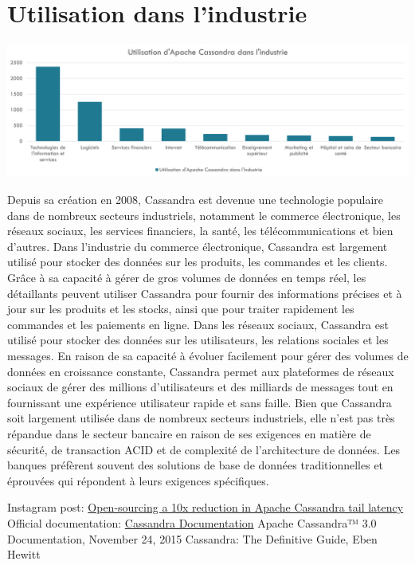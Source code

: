 \documentclass[12pt, letterpaper]{report}
\begin{document}
\section{Utilisation dans l'industrie}
\begin{center}
	\includegraphics[width=\textwidth]{utilisation}
\end{center}
Depuis sa création en 2008, Cassandra est devenue une technologie populaire dans de nombreux secteurs industriels, notamment le commerce électronique, les réseaux sociaux, les services financiers, la santé, les télécommunications et bien d'autres.
\newline
Dans l'industrie du commerce électronique, Cassandra est largement utilisé pour stocker des données sur les produits, les commandes et les clients. Grâce à sa capacité à gérer de gros volumes de données en temps réel, les détaillants peuvent utiliser Cassandra pour fournir des informations précises et à jour sur les produits et les stocks, ainsi que pour traiter rapidement les commandes et les paiements en ligne.
\newline
Dans les réseaux sociaux, Cassandra est utilisé pour stocker des données sur les utilisateurs, les relations sociales et les messages. En raison de sa capacité à évoluer facilement pour gérer des volumes de données en croissance constante, Cassandra permet aux plateformes de réseaux sociaux de gérer des millions d'utilisateurs et des milliards de messages tout en fournissant une expérience utilisateur rapide et sans faille.
\newline
Bien que Cassandra soit largement utilisée dans de nombreux secteurs industriels, elle n'est pas très répandue dans le secteur bancaire en raison de ses exigences en matière de sécurité, de transaction ACID et de complexité de l'architecture de données. Les banques préfèrent souvent des solutions de base de données traditionnelles et éprouvées qui répondent à leurs exigences spécifiques.
\begin{thebibliography}{widest entry} 
  Instagram post: 
 \href{https://instagram-engineering.com/open-sourcing-a-10x-reduction-in-apache-cassandra-tail-latency-d64f86b43589}{Open-sourcing a 10x reduction in Apache Cassandra tail latency}
  Official documentation: 
 \href{https://cassandra.apache.org/doc/latest/index.html}{Cassandra Documentation}
  Apache Cassandra™ 3.0 Documentation, November 24, 2015
  Cassandra: The Definitive Guide, Eben Hewitt
\end{thebibliography}
\end{document}
